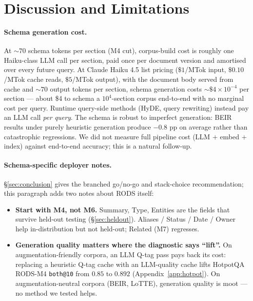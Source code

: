\documentclass[11pt]{article}
\begin{document}
\section{Discussion and Limitations}
\label{sec:limits}

\paragraph{Schema generation cost.}
At $\sim 70$ schema tokens per section (M4 cut), corpus-build cost
is roughly one Haiku-class LLM call per section, paid once per
document version and amortised over every future query. At Claude
Haiku 4.5 list pricing ($\$1$/MTok input, $\$0.10$/MTok cache reads,
$\$5$/MTok output), with the document body served from cache and
$\sim 70$ output tokens per section, schema generation costs
$\sim \$4 \times 10^{-4}$ per section --- about \$4 to schema a
$10^4$-section corpus end-to-end with no marginal cost per query.
Runtime query-side methods (HyDE, query rewriting) instead pay an
LLM call \emph{per query}. The schema is robust to imperfect
generation: BEIR results under purely heuristic generation produce
$-0.8$ pp on average rather than catastrophic regressions. We did
not measure full pipeline cost (LLM $+$ embed $+$ index) against
end-to-end accuracy; this is a natural follow-up.

\paragraph{Schema-specific deployer notes.}
\S\ref{sec:conclusion} gives the branched go/no-go and stack-choice
recommendation; this paragraph adds two notes about RODS itself:
\begin{itemize}[noitemsep,topsep=0.2em,leftmargin=1.5em]
\item \textbf{Start with M4, not M6.} Summary, Type, Entities are the
      fields that survive held-out testing (\S\ref{sec:heldout}).
      Aliases / Status / Date / Owner help in-distribution but not
      held-out; Related (M7) regresses.
\item \textbf{Generation quality matters where the diagnostic says
      ``lift''.} On augmentation-friendly corpora, an LLM Q-tag pass
      pays back its cost: replacing a heuristic Q-tag cache with an
      LLM-quality cache lifts HotpotQA RODS-M4 \texttt{both@10} from
      $0.85$ to $0.892$ (Appendix~\ref{app:hotpot}). On
      augmentation-neutral corpora (BEIR, LoTTE), generation quality
      is moot --- no method we tested helps.
\end{itemize}
\end{document}

